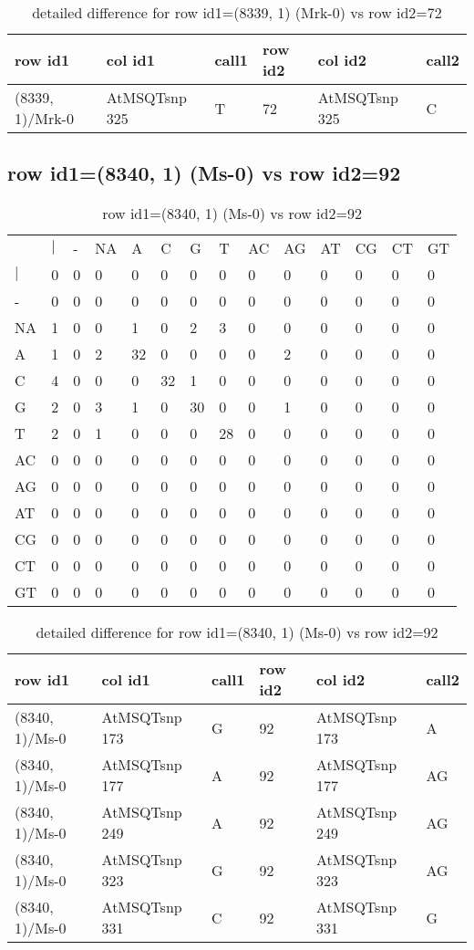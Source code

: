 \begin{center}
\begin{longtable}{|l|l|l|l|l|l|}
\caption{detailed difference for row id1=(8339, 1) (Mrk-0) vs row id2=72} \label{table_dm541}\\
\hline
row id1&col id1&call1&row id2&col id2&call2\\
\hline
(8339, 1)/Mrk-0&AtMSQTsnp 325&T&72&AtMSQTsnp 325&C\\
\hline
\end{longtable}
\end{center}

\subsection{row id1=(8340, 1) (Ms-0) vs row id2=92}
\begin{center}
\begin{longtable}{|l|l|l|l|l|l|l|l|l|l|l|l|l|l|}
\caption{row id1=(8340, 1) (Ms-0) vs row id2=92} \label{table_dm542}\\
\hline
\\
\hline
&$|$&-&NA&A&C&G&T&AC&AG&AT&CG&CT&GT\\
$|$&0&0&0&0&0&0&0&0&0&0&0&0&0\\
-&0&0&0&0&0&0&0&0&0&0&0&0&0\\
NA&1&0&0&1&0&2&3&0&0&0&0&0&0\\
A&1&0&2&32&0&0&0&0&2&0&0&0&0\\
C&4&0&0&0&32&1&0&0&0&0&0&0&0\\
G&2&0&3&1&0&30&0&0&1&0&0&0&0\\
T&2&0&1&0&0&0&28&0&0&0&0&0&0\\
AC&0&0&0&0&0&0&0&0&0&0&0&0&0\\
AG&0&0&0&0&0&0&0&0&0&0&0&0&0\\
AT&0&0&0&0&0&0&0&0&0&0&0&0&0\\
CG&0&0&0&0&0&0&0&0&0&0&0&0&0\\
CT&0&0&0&0&0&0&0&0&0&0&0&0&0\\
GT&0&0&0&0&0&0&0&0&0&0&0&0&0\\
\hline
\end{longtable}
\end{center}

\begin{center}
\begin{longtable}{|l|l|l|l|l|l|}
\caption{detailed difference for row id1=(8340, 1) (Ms-0) vs row id2=92} \label{table_dm543}\\
\hline
row id1&col id1&call1&row id2&col id2&call2\\
\hline
(8340, 1)/Ms-0&AtMSQTsnp 173&G&92&AtMSQTsnp 173&A\\
(8340, 1)/Ms-0&AtMSQTsnp 177&A&92&AtMSQTsnp 177&AG\\
(8340, 1)/Ms-0&AtMSQTsnp 249&A&92&AtMSQTsnp 249&AG\\
(8340, 1)/Ms-0&AtMSQTsnp 323&G&92&AtMSQTsnp 323&AG\\
(8340, 1)/Ms-0&AtMSQTsnp 331&C&92&AtMSQTsnp 331&G\\
\hline
\end{longtable}
\end{center}

